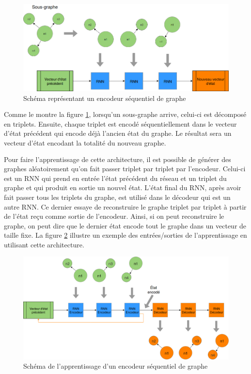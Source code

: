 \begin{figure}
	\centering
	\includegraphics[width=0.8\linewidth]{images/Conception/DM/encoder_seq.png}
	\caption{Schéma représentant un encodeur séquentiel de graphe}\label{encoder_seq}
	
\end{figure}
\par Comme le montre la figure \ref{encoder_seq}, lorsqu'un sous-graphe arrive, celui-ci est décomposé en triplets. Ensuite, chaque triplet est encodé séquentiellement dans le vecteur d'état précédent qui encode déjà l'ancien état du graphe. Le résultat sera un vecteur d'état encodant la totalité du nouveau graphe.
\par Pour faire l'apprentissage de cette architecture, il est possible de générer des graphes aléatoirement qu'on fait passer triplet par triplet par l'encodeur. Celui-ci est un RNN qui prend en entrée l'état précédent du réseau et un triplet du graphe et qui produit en sortie un nouvel état. L'état final du RNN, après avoir fait passer tous les triplets du graphe, est utilisé dans le décodeur qui est un autre RNN. Ce dernier essaye de reconstruire le graphe triplet par triplet à partir de l'état reçu comme sortie de l'encodeur. Ainsi, si on peut reconstruire le graphe, on peut dire que le dernier état encode tout le graphe dans un vecteur de taille fixe. La figure \ref{encoder_seq_train} illustre un exemple des entrées/sorties de l'apprentissage en utilisant  cette architecture.
\begin{figure}[H]
	\centering
	\includegraphics[width=0.9\linewidth]{images/Conception/DM/encoder_seq_train.png}
	\caption{Schéma de l'apprentissage d'un encodeur séquentiel de graphe}\label{encoder_seq_train}
	
\end{figure}
